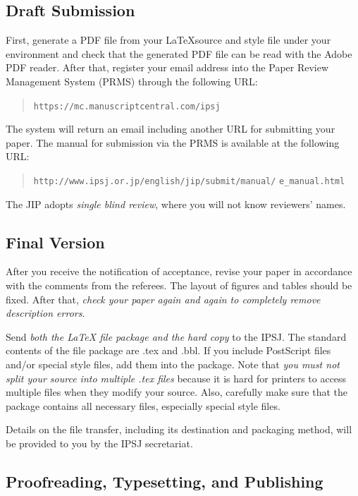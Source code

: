 \documentclass[english,preprint,JIP]{ipsj-lualatex}
\def\|{\verb|}
\begin{document}


%2.2
\subsection{Draft Submission}

First, generate a PDF file from your \LaTeX source and style file under
your {\LaTeXe} environment and check that the generated PDF file can be
read with the Adobe PDF reader.  After that, register your email address
into the Paper Review Management System (PRMS) through the following
URL:
\begin{quote}
 \small
 \|https://mc.manuscriptcentral.com/ipsj|
\end{quote}

\noindent
The system will return an email including another URL for submitting
your paper. The manual for submission via the PRMS is available at the
following URL: 
\begin{quote}
 \small
 \|http://www.ipsj.or.jp/english/jip/submit/manual/|
 \|e_manual.html|
\end{quote}

The JIP adopts \textit{single blind review}, 
where you will not know reviewers' names.


\subsection{Final Version}

After you receive the notification of acceptance, revise your paper in
accordance with the comments from the referees.
The layout of
figures and tables should be fixed. After that, \textit{check your paper
again and again to completely remove description errors}.

Send \textit{both the {\LaTeX} file package and the hard copy} to the
IPSJ\@. The standard contents of the file package are .tex and .bbl. If
you include PostScript files and/or special style files, add them into
the package. Note that \textit{you must not split your source into
multiple .tex files} because it is hard for printers to access multiple
files when they modify your source. Also, carefully make sure that the
package contains all necessary files, especially special style files.

Details on the file transfer, including its destination and packaging
method, will be provided to you by the IPSJ secretariat.

\subsection{Proofreading, Typesetting, and Publishing}
\end{document}
